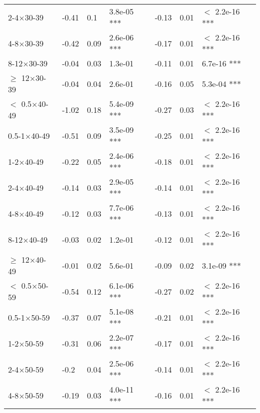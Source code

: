 \documentclass{article}\usepackage[utf8]{inputenc}
\begin{document}
\begin{longtable}[t]{lllllll}
\hspace{1em}2-4$\times$30-39 & -0.41 & 0.1 & 3.8e-05 *** & -0.13 & 0.01 & $<$ 2.2e-16 ***\\
\hspace{1em}4-8$\times$30-39 & -0.42 & 0.09 & 2.6e-06 *** & -0.17 & 0.01 & $<$ 2.2e-16 ***\\
\hspace{1em}8-12$\times$30-39 & -0.04 & 0.03 & 1.3e-01 & -0.11 & 0.01 & 6.7e-16 ***\\
\hspace{1em}$\geq$ 12$\times$30-39 & -0.04 & 0.04 & 2.6e-01 & -0.16 & 0.05 & 5.3e-04 ***\\
\hspace{1em}$<$ 0.5$\times$40-49 & -1.02 & 0.18 & 5.4e-09 *** & -0.27 & 0.03 & $<$ 2.2e-16 ***\\
\hspace{1em}0.5-1$\times$40-49 & -0.51 & 0.09 & 3.5e-09 *** & -0.25 & 0.01 & $<$ 2.2e-16 ***\\
\hspace{1em}1-2$\times$40-49 & -0.22 & 0.05 & 2.4e-06 *** & -0.18 & 0.01 & $<$ 2.2e-16 ***\\
\hspace{1em}2-4$\times$40-49 & -0.14 & 0.03 & 2.9e-05 *** & -0.14 & 0.01 & $<$ 2.2e-16 ***\\
\hspace{1em}4-8$\times$40-49 & -0.12 & 0.03 & 7.7e-06 *** & -0.13 & 0.01 & $<$ 2.2e-16 ***\\
\hspace{1em}8-12$\times$40-49 & -0.03 & 0.02 & 1.2e-01 & -0.12 & 0.01 & $<$ 2.2e-16 ***\\
\hspace{1em}$\geq$ 12$\times$40-49 & -0.01 & 0.02 & 5.6e-01 & -0.09 & 0.02 & 3.1e-09 ***\\
\hspace{1em}$<$ 0.5$\times$50-59 & -0.54 & 0.12 & 6.1e-06 *** & -0.27 & 0.02 & $<$ 2.2e-16 ***\\
\hspace{1em}0.5-1$\times$50-59 & -0.37 & 0.07 & 5.1e-08 *** & -0.21 & 0.01 & $<$ 2.2e-16 ***\\
\hspace{1em}1-2$\times$50-59 & -0.31 & 0.06 & 2.2e-07 *** & -0.17 & 0.01 & $<$ 2.2e-16 ***\\
\hspace{1em}2-4$\times$50-59 & -0.2 & 0.04 & 2.5e-06 *** & -0.14 & 0.01 & $<$ 2.2e-16 ***\\
\hspace{1em}4-8$\times$50-59 & -0.19 & 0.03 & 4.0e-11 *** & -0.16 & 0.01 & $<$ 2.2e-16 ***\\

\end{longtable}
\end{document}
